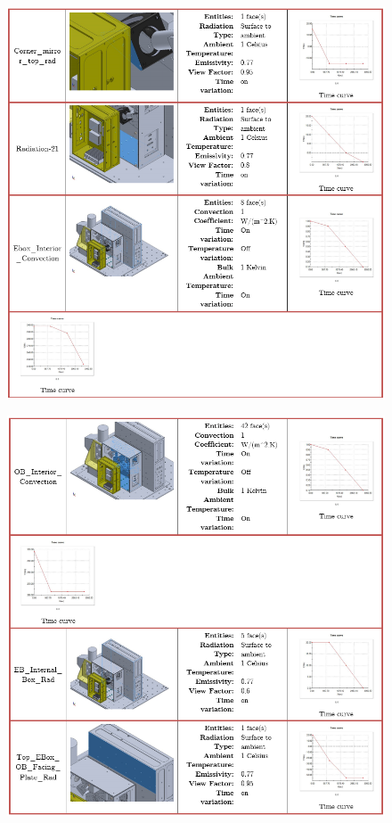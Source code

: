 \begin{figure}
    \centering
    \includegraphics[width=\textwidth]{thermal_load_images/ascent_pt1_TL_images/ascesnt_pt1_11.PNG}
\end{figure}

\begin{figure}
    \centering
    \includegraphics[width=\textwidth]{thermal_load_images/ascent_pt1_TL_images/ascesnt_pt1_12.PNG}
\end{figure}

